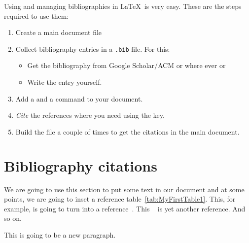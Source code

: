 \documentclass[twocolumn]{article}
\begin{document}
\medskip
Using and managing bibliographies in \LaTeX\ is very easy. 
These are the steps required to use them: 

\begin{enumerate}
	\item Create a main document file 
	\item Collect bibliography entries in a \Verb|.bib| file. For this: 
	\begin{itemize}
		\item Get the bibliography from Google Scholar/ACM or where ever or 
		\item Write the entry yourself. 
	\end{itemize}
	\item Add a \verb|| and a \Verb|| command to your document. 
	\item \emph{Cite} the references where you need using the key. 
	\item Build the file a couple of times to get the citations in the main document. 
\end{enumerate}




\section{Bibliography citations}
We are going to use this section to put some text in our document and at some points, we are going to inset a reference table~\ref{tab:MyFirstTable1}. This, for example, is going to turn into a reference~\cite{lecun2015deep}. This ~\cite{webster1984specific} is yet another reference. And so on.~\cite{nauman2010apex}

This is going to be a new paragraph.







\end{document}
